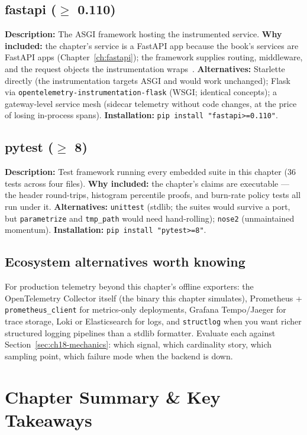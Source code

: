 \subsection{fastapi ($\geq$ 0.110)}
\textbf{Description:} The ASGI framework hosting the instrumented service.
\textbf{Why included:} the chapter's service is a FastAPI app because the
book's services are FastAPI apps (Chapter~\ref{ch:fastapi}); the framework
supplies routing, middleware, and the request objects the instrumentation
wraps~\cite{fastapidocs}. \textbf{Alternatives:} Starlette directly (the
instrumentation targets ASGI and would work unchanged); Flask via
\texttt{opentelemetry-instrumentation-flask} (WSGI; identical concepts);
a gateway-level service mesh (sidecar telemetry without code changes, at
the price of losing in-process spans). \textbf{Installation:}
\texttt{pip install "fastapi>=0.110"}.

\subsection{pytest ($\geq$ 8)}
\textbf{Description:} Test framework running every embedded suite in this
chapter (36 tests across four files). \textbf{Why included:} the chapter's
claims are executable --- the header round-trips, histogram percentile
proofs, and burn-rate policy tests all run under it.
\textbf{Alternatives:} \texttt{unittest} (stdlib; the suites would survive
a port, but \texttt{parametrize} and \texttt{tmp\_path} would need
hand-rolling); \texttt{nose2} (unmaintained momentum). \textbf{Installation:}
\texttt{pip install "pytest>=8"}.

\subsection*{Ecosystem alternatives worth knowing}
For production telemetry beyond this chapter's offline exporters: the
OpenTelemetry Collector itself (the binary this chapter simulates),
Prometheus + \texttt{prometheus\_client} for metrics-only deployments,
Grafana Tempo/Jaeger for trace storage, Loki or Elasticsearch for logs,
and \texttt{structlog} when you want richer structured logging pipelines
than a stdlib formatter. Evaluate each against
Section~\ref{sec:ch18-mechanics}: which signal, which cardinality story,
which sampling point, which failure mode when the backend is down.

\section{Chapter Summary \& Key Takeaways}
\label{sec:ch18-summary}

